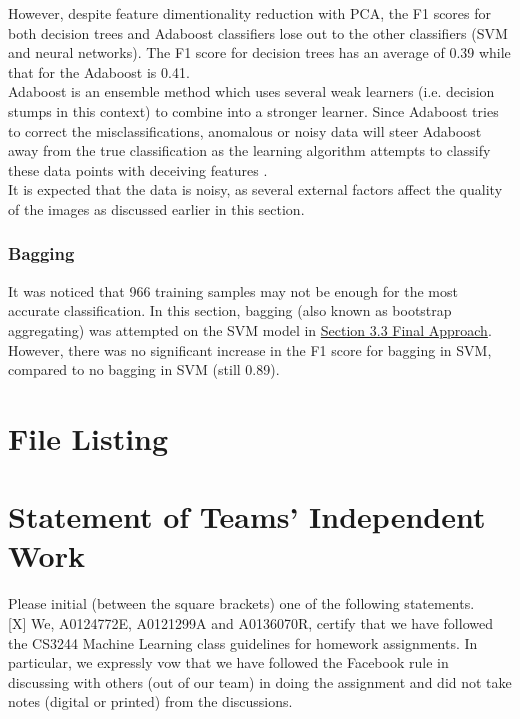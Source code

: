 \documentclass{article}
\begin{document}
However, despite feature dimentionality reduction with PCA, the F1 scores for both decision trees and Adaboost classifiers lose out to the other classifiers (SVM and neural networks). The F1 score for decision trees has an average of 0.39 while that for the Adaboost is 0.41. \\

Adaboost is an ensemble method which uses several weak learners (i.e. decision stumps in this context) to combine into a stronger learner. Since Adaboost tries to correct the misclassifications, anomalous or noisy data will steer Adaboost away from the true classification as the learning algorithm attempts to classify these data points with deceiving features \cite{bib-02}. \\

It is expected that the data is noisy, as several external factors affect the quality of the images as discussed earlier in this section.

\subsubsection{Bagging}
It was noticed that 966 training samples may not be enough for the most accurate classification. In this section, bagging (also known as bootstrap aggregating) was attempted on the SVM model in \hyperref[sec:3.3]{Section 3.3 Final Approach}. \\

However, there was no significant increase in the F1 score for bagging in SVM, compared to no bagging in SVM (still 0.89).

\newpage

\section{File Listing}
\newpage

\section{Statement of Teams' Independent Work}
Please initial (between the square brackets) one of the following statements. \\

[X] We, A0124772E, A0121299A and A0136070R, certify that we have followed the CS3244 Machine Learning class guidelines for homework assignments. In particular, we expressly vow that we have followed the Facebook rule in discussing with others (out of our team) in doing the assignment and did not take notes (digital or printed) from the discussions. \\
\end{document}

